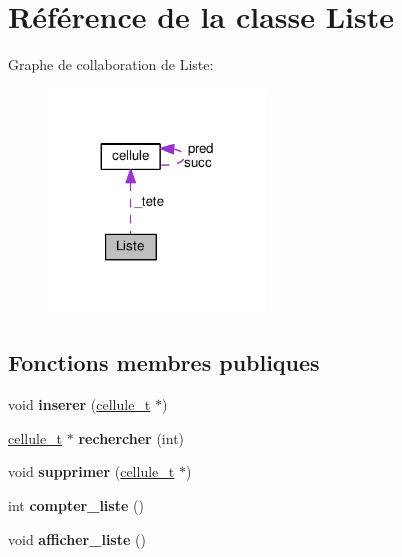 \hypertarget{classListe}{\section{Référence de la classe Liste}
\label{classListe}
}


Graphe de collaboration de Liste\+:\nopagebreak
\begin{figure}[H]
\begin{center}
\leavevmode
\includegraphics[width=164pt]{classListe__coll__graph}
\end{center}
\end{figure}
\subsection*{Fonctions membres publiques}
\begin{DoxyCompactItemize}
\item 
\hypertarget{classListe_a0b5ce6f952058cf3d9b124c76c508b37}{void {\bfseries inserer} (\hyperlink{structcellule}{cellule\+\_\+t} $\ast$)}\label{classListe_a0b5ce6f952058cf3d9b124c76c508b37}

\item 
\hypertarget{classListe_a37e9a70e70ffbdf709494f5eda93b2c1}{\hyperlink{structcellule}{cellule\+\_\+t} $\ast$ {\bfseries rechercher} (int)}\label{classListe_a37e9a70e70ffbdf709494f5eda93b2c1}

\item 
\hypertarget{classListe_ad49550c8526fdc22cfb99da6e7741978}{void {\bfseries supprimer} (\hyperlink{structcellule}{cellule\+\_\+t} $\ast$)}\label{classListe_ad49550c8526fdc22cfb99da6e7741978}

\item 
\hypertarget{classListe_aadf373e279e6786bca499f5f8953548f}{int {\bfseries compter\+\_\+liste} ()}\label{classListe_aadf373e279e6786bca499f5f8953548f}

\item 
\hypertarget{classListe_adcec4235c891e6dfea8f96f3d405c048}{void {\bfseries afficher\+\_\+liste} ()}\label{classListe_adcec4235c891e6dfea8f96f3d405c048}

\end{DoxyCompactItemize}
